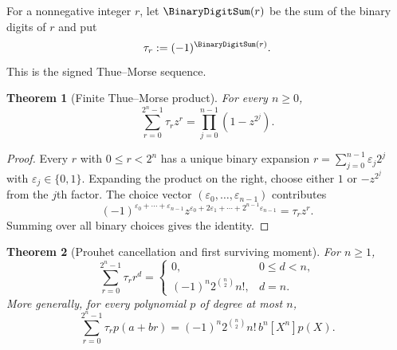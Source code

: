 \documentclass[11pt,a4paper,oneside,openany]{book}
\newtheorem{theorem}{Theorem}[chapter]
\theoremstyle{definition}
\theoremstyle{remark}
\begin{document}
For a nonnegative integer $r$, let $\BinaryDigitSum(r)$ be the sum of the binary digits of $r$ and put
\[
 \tau_r:=(-1)^{\BinaryDigitSum(r)}.
\]
This is the signed Thue--Morse sequence.

\begin{theorem}[Finite Thue--Morse product]\label{thm:thue-morse-product}
For every $n\ge0$,
\begin{equation}\label{eq:thue-morse-product}
 \sum_{r=0}^{2^n-1}\tau_r z^r
 =\prod_{j=0}^{n-1}(1-z^{2^j}).
\end{equation}
\end{theorem}

\begin{proof}
Every $r$ with $0\le r<2^n$ has a unique binary expansion
$r=\sum_{j=0}^{n-1}\varepsilon_j2^j$ with $\varepsilon_j\in\{0,1\}$.  Expanding the product on the right, choose either $1$ or $-z^{2^j}$ from the $j$th factor.  The choice vector $(\varepsilon_0,\ldots,\varepsilon_{n-1})$ contributes
\[
 (-1)^{\varepsilon_0+\cdots+\varepsilon_{n-1}}
 z^{\varepsilon_0+2\varepsilon_1+\cdots+2^{n-1}\varepsilon_{n-1}}
 =\tau_rz^r.
\]
Summing over all binary choices gives the identity.
\end{proof}

\begin{theorem}[Prouhet cancellation and first surviving moment]\label{thm:thue-morse-moments}
For $n\ge1$,
\begin{equation}\label{eq:thue-morse-moments}
 \sum_{r=0}^{2^n-1}\tau_r r^d
 =
 \begin{cases}
  0,&0\le d<n,\\
  (-1)^n2^{\binom n2}n!,&d=n.
 \end{cases}
\end{equation}
More generally, for every polynomial $p$ of degree at most $n$,
\begin{equation}\label{eq:thue-morse-polynomial-functional}
 \sum_{r=0}^{2^n-1}\tau_r p(a+br)
 =(-1)^n2^{\binom n2}n!\,b^n[X^n]p(X).
\end{equation}
\end{theorem}
\end{document}
